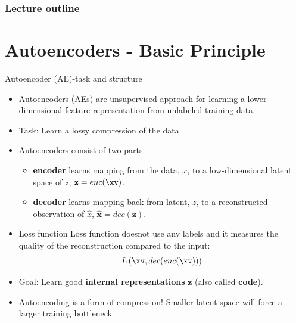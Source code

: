 
 







\begin{frame}
\frametitle{Lecture outline}
\tableofcontents
\end{frame}

\section{Autoencoders - Basic Principle}

\begin{vbframe}{Autoencoder (AE)-task and structure}

  \begin{itemize}
  \item Autoencoders (AEs) are unsupervised approach for learning a lower dimensional feature representation from unlabeled training data.
  \item Task: Learn a lossy compression of the data 
  \item Autoencoders consist of two parts:
  \begin{itemize}
            \item \textbf{encoder} learns mapping from the data, $x$, to a low-dimensional latent space of $z$,  $\mathbf{z} = enc(\xv)$.
            \item \textbf{decoder} learns mapping back from latent, $z$, to a reconstructed observation of $\hat {{x}}$,  $\hat {\mathbf{x}} = dec(\mathbf{z})$.
  \end{itemize}
    \item Loss function Loss function doesnot use any labels and it measures the quality of the reconstruction compared to the input: 
    $$
      L\left(\xv, dec(enc(\xv))\right)
    $$
    \item Goal: Learn good \textbf{internal representations} $\mathbf{z}$ (also called \textbf{code}).
    \item Autoencoding is a form of compression! Smaller latent space will force a larger training bottleneck

  \end{itemize}
  
\end{vbframe}
